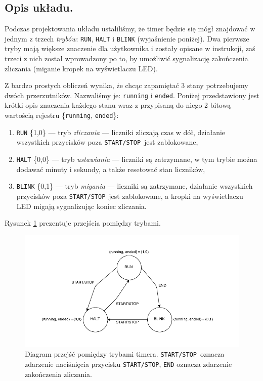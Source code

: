 \documentclass[a4paper,oneside]{report}
\newcommand{\startstop}{\texttt{START/STOP}}
\begin{document}
\subsection{Opis układu.}
Podczas projektowania układu ustaliliśmy, że timer będzie się mógł
znajdować w jednym z trzech \emph{trybów}: \texttt{RUN},
\texttt{HALT} i \texttt{BLINK} (wyjaśnienie poniżej). Dwa pierwsze
tryby mają większe znaczenie dla użytkownika i zostały opisane w
instrukcji, zaś trzeci z nich został wprowadzony po to, by
umożliwić sygnalizację zakończenia zliczania (miganie kropek
na wyświetlaczu LED).

Z bardzo prostych obliczeń wynika, że chcąc zapamiętać 3 stany
potrzebujemy dwóch przerzutników. Nazwaliśmy je: \texttt{running} i
\texttt{ended}. Poniżej przedstawiony jest krótki opis znaczenia
każdego stanu wraz z przypisaną do niego 2-bitową wartością
rejestru \{\texttt{running}, \texttt{ended}\}:
\begin{enumerate}
\item \texttt{RUN} \{1,0\} --- tryb \emph{zliczania} --- liczniki
zliczają czas w dół, działanie wszystkich przycisków poza
\startstop\ jest zablokowane,
\item \texttt{HALT} \{0,0\} --- tryb \emph{ustawiania} --- liczniki
są zatrzymane, w tym trybie można dodawać minuty i sekundy, a także
resetować stan liczników,
\item \texttt{BLINK} \{0,1\} --- tryb \emph{migania} --- liczniki
są zatrzymane, działanie wszystkich przycisków poza \startstop\
jest zablokowane, a kropki na wyświetlaczu LED migają sygnalizując
koniec zliczania.
\end{enumerate}

Rysunek \ref{state_diagram} prezentuje przejścia pomiędzy trybami.
\begin{figure}[htbp]
\centering
\includegraphics{state_diagram.pdf}
\caption[Diagram przejść pomiędzy trybami timera.]{Diagram przejść
pomiędzy trybami timera. \startstop\ oznacza zdarzenie naciśnięcia
przycisku \startstop , \texttt{END} oznacza zdarzenie zakończenia
zliczania.}
\label{state_diagram}
\end{figure}
\end{document}
